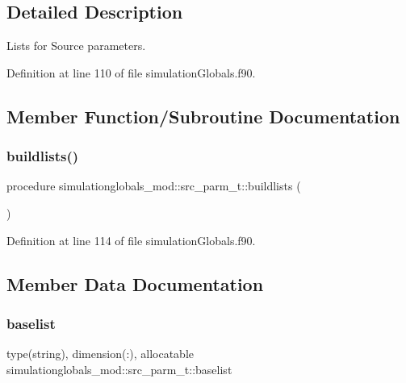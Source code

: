 \subsection{Detailed Description}
Lists for Source parameters. 

Definition at line 110 of file simulation\+Globals.\+f90.



\subsection{Member Function/\+Subroutine Documentation}
\mbox{\label{structsimulationglobals__mod_1_1src__parm__t_a0dd15ea4d9d7bb28eb4bca8a3a4262f1}} 
\subsubsection{\texorpdfstring{buildlists()}{buildlists()}}
{\footnotesize\ttfamily procedure simulationglobals\+\_\+mod\+::src\+\_\+parm\+\_\+t\+::buildlists (\begin{DoxyParamCaption}{ }\end{DoxyParamCaption})\hspace{0.3cm}{\ttfamily [private]}}



Definition at line 114 of file simulation\+Globals.\+f90.



\subsection{Member Data Documentation}
\mbox{\label{structsimulationglobals__mod_1_1src__parm__t_ad17cf719066b0385f9e88a09ea61071b}} 
\subsubsection{\texorpdfstring{baselist}{baselist}}
{\footnotesize\ttfamily type(string), dimension(\+:), allocatable simulationglobals\+\_\+mod\+::src\+\_\+parm\+\_\+t\+::baselist\hspace{0.3cm}{\ttfamily [private]}}



